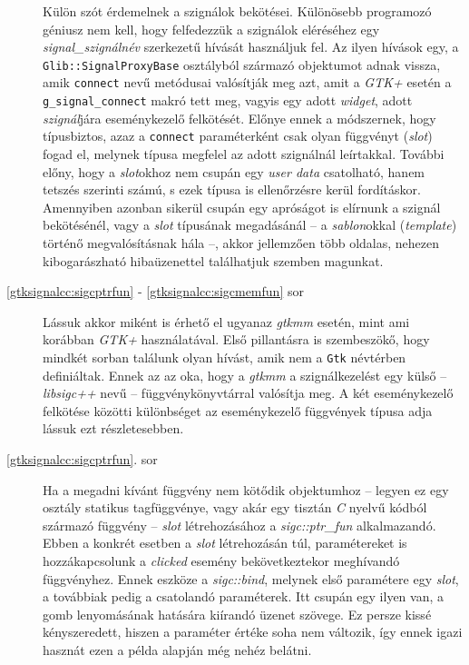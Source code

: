 \begin{description}
 Külön szót érdemelnek a szignálok bekötései. Különösebb programozó géniusz nem kell, hogy felfedezzük a szignálok eléréséhez egy \textit{signal\_}\textit{szignálnév} szerkezetű hívását használjuk fel. Az ilyen hívások egy, a \texttt{Glib::SignalProxyBase} osztályból származó objektumot adnak vissza, amik \texttt{connect} nevű metódusai valósítják meg azt, amit a \textit{GTK+} esetén a \texttt{g\_signal\_connect} makró tett meg, vagyis egy adott \textit{widget}, adott \textit{szignál}jára eseménykezelő felkötését. Előnye ennek a módszernek, hogy típusbiztos, azaz a \texttt{connect} paraméterként csak olyan függvényt (\textit{slot}) fogad el, melynek típusa megfelel az adott szignálnál leírtakkal. További előny, hogy a \textit{slot}okhoz nem csupán egy \textit{user data} csatolható, hanem tetszés szerinti számú, s ezek típusa is ellenőrzésre kerül fordításkor. Amennyiben azonban sikerül csupán egy apróságot is elírnunk a szignál bekötésénél, vagy a \textit{slot} típusának megadásánál -- a \textit{sablon}okkal (\textit{template}) történő megvalósításnak hála --, akkor jellemzően több oldalas, nehezen kibogarászható hibaüzenettel találhatjuk szemben magunkat.

 \item[\ref{gtksignalcc:sigcptrfun} - \ref{gtksignalcc:sigcmemfun} sor] Lássuk akkor miként is érhető el ugyanaz \textit{gtkmm} esetén, mint ami korábban \textit{GTK+} használatával. Első pillantásra is szembeszökő, hogy mindkét sorban találunk olyan hívást, amik nem a \texttt{Gtk} névtérben definiáltak. Ennek az az oka, hogy a \textit{gtkmm} a szignálkezelést egy külső -- \textit{libsigc++} nevű -- függvénykönyvtárral valósítja meg. A két eseménykezelő felkötése közötti különbséget az eseménykezelő függvények típusa adja lássuk ezt részletesebben.

 \item[\ref{gtksignalcc:sigcptrfun}. sor] Ha a megadni kívánt függvény nem kötődik objektumhoz -- legyen ez egy osztály statikus tagfüggvénye, vagy akár egy tisztán \textit{C} nyelvű kódból származó függvény -- \textit{slot} létrehozásához a \textit{sigc::ptr\_fun} alkalmazandó. Ebben a konkrét esetben a \textit{slot} létrehozásán túl, paramétereket is hozzákapcsolunk a \textit{clicked} esemény bekövetkeztekor meghívandó függvényhez. Ennek eszköze a \textit{sigc::bind}, melynek első paramétere egy \textit{slot}, a továbbiak pedig a csatolandó paraméterek. Itt csupán egy ilyen van, a gomb lenyomásának hatására kiírandó üzenet szövege. Ez persze kissé kényszeredett, hiszen a paraméter értéke soha nem változik, így ennek igazi hasznát ezen a példa alapján még nehéz belátni.


\end{description}
